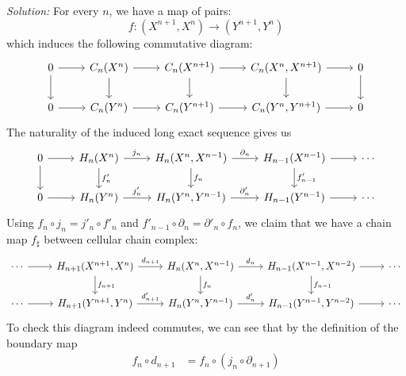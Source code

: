 \documentclass[a4paper, 12pt]{article}
\newenvironment{solution}
    {\textit{Solution:}}
    {}
\begin{document}
\begin{solution}
For every \(n\), we have a map of pairs:
\[f:(X^{n+1},X^n)\rightarrow (Y^{n+1},Y^n)\]
which induces the following commutative diagram:
\[\begin{tikzcd}
	0 & {C_n(X^n)} & {C_n(X^{n+1})} & {C_n(X^n,X^{n+1})} & 0 \\
	0 & {C_n(Y^n)} & {C_n(Y^{n+1})} & {C_n(Y^n,Y^{n+1})} & 0
	\arrow[from=1-1, to=1-2]
	\arrow[from=1-1, to=2-1]
	\arrow[from=1-2, to=1-3]
	\arrow[from=1-2, to=2-2]
	\arrow[from=1-3, to=1-4]
	\arrow[from=1-3, to=2-3]
	\arrow[from=1-4, to=1-5]
	\arrow[from=1-4, to=2-4]
	\arrow[from=1-5, to=2-5]
	\arrow[from=2-1, to=2-2]
	\arrow[from=2-2, to=2-3]
	\arrow[from=2-3, to=2-4]
	\arrow[from=2-4, to=2-5]
\end{tikzcd}\]
The naturality of the induced long exact sequence gives us 
\[\begin{tikzcd}
	0 & {H_n(X^n)} & {H_n(X^n,X^{n-1})} & {H_{n-1}(X^{n-1})} & \cdots \\
	0 & {H_n(Y^n)} & {H_n(Y^n,Y^{n-1})} & {H_{n-1}(Y^{n-1})} & \cdots
	\arrow[from=1-1, to=1-2]
	\arrow[from=1-1, to=2-1]
	\arrow["{j_n}", from=1-2, to=1-3]
	\arrow["{f'_n}", from=1-2, to=2-2]
	\arrow["{\partial_n}", from=1-3, to=1-4]
	\arrow["{f_n}", from=1-3, to=2-3]
	\arrow[from=1-4, to=1-5]
	\arrow["{f'_{n-1}}", from=1-4, to=2-4]
	\arrow[from=2-1, to=2-2]
	\arrow["{j'_n}", from=2-2, to=2-3]
	\arrow["{\partial'_n}", from=2-3, to=2-4]
	\arrow[from=2-4, to=2-5]
\end{tikzcd}\]
Using \(f_n\circ j_n=j'_n\circ f'_n\) and \(f'_{n-1}\circ \partial_n=\partial'_n\circ f_n\), we claim that we have a chain map \(f_\sharp\) between cellular chain complex:
\[\begin{tikzcd}
	\cdots & {H_{n+1}(X^{n+1},X^n)} & {H_n(X^n,X^{n-1})} & {H_{n-1}(X^{n-1},X^{n-2})} & \cdots \\
	\cdots & {H_{n+1}(Y^{n+1},Y^n)} & {H_n(Y^n,Y^{n-1})} & {H_{n-1}(Y^{n-1},Y^{n-2})} & \cdots
	\arrow[from=1-1, to=1-2]
	\arrow["{d_{n+1}}", from=1-2, to=1-3]
	\arrow["{f_{n+1}}", from=1-2, to=2-2]
	\arrow["{d_n}", from=1-3, to=1-4]
	\arrow["{f_n}", from=1-3, to=2-3]
	\arrow[from=1-4, to=1-5]
	\arrow["{f_{n-1}}", from=1-4, to=2-4]
	\arrow[from=2-1, to=2-2]
	\arrow["{d'_{n+1}}", from=2-2, to=2-3]
	\arrow["{d'_n}", from=2-3, to=2-4]
	\arrow[from=2-4, to=2-5]
\end{tikzcd}\]
To check this diagram indeed commutes, we can see that by the definition of the boundary map
\begin{align*}
    f_n\circ d_{n+1}&=f_n\circ (j_n\circ \partial_{n+1})\\ 

\end{align*}
\end{solution}
\end{document}
